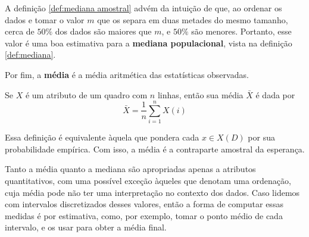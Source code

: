 A definição \ref{def:mediana amostral} advém da intuição de que, ao ordenar os dados
e tomar o valor $m$ que os separa em duas metades do mesmo tamanho, cerca de $50\%$ dos
dados são maiores que $m$, e $50\%$ são menores.
Portanto, esse valor é uma boa estimativa para a \textbf{mediana populacional}, vista
na definição \ref{def:mediana}.

Por fim, a \textbf{média} é a média aritmética das estatísticas observadas.
\begin{def:media}
Se $X$ é um atributo de um quadro com $n$ linhas, então sua média $\bar X$ é dada por
\[
    \bar X = \frac 1 n \sum_{i=1}^n X(i)
\]
\end{def:media}
Essa definição é equivalente àquela que pondera cada $x \in X(D)$ por sua probabilidade
empírica.
Com isso, a média é a contraparte amostral da esperança.

Tanto a média quanto a mediana são apropriadas apenas a atributos quantitativos, com
uma possível exceção àqueles que denotam uma ordenação, cuja média pode não ter uma
interpretação no contexto dos dados.
Caso lidemos com intervalos discretizados desses valores, então a forma de
computar essas medidas é por estimativa, como, por exemplo, tomar o ponto médio de
cada intervalo, e os usar para obter a média final.
